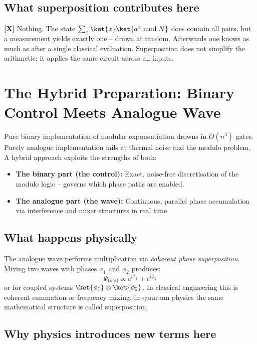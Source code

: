 \subsection{What superposition contributes here}

\textbf{[X]} Nothing. The state $\sum_x \ket{x}\ket{a^x \bmod N}$ does
contain all pairs, but a measurement yields exactly one -- drawn at
random. Afterwards one knows as much as after a single classical
evaluation. Superposition does not simplify the arithmetic; it applies
the same circuit across all inputs.


\section{The Hybrid Preparation: Binary Control Meets Analogue Wave}
\label{sec:hybrid}

Pure binary implementation of modular exponentiation drowns in $O(n^3)$
gates. Purely analogue implementation fails at thermal noise and the
modulo problem. A hybrid approach exploits the strengths of both:

\begin{itemize}
  \item \textbf{The binary part (the control):} Exact, noise-free
    discretisation of the modulo logic -- governs which phase paths are
    enabled.
  \item \textbf{The analogue part (the wave):} Continuous, parallel
    phase accumulation via interference and mixer structures in real time.
\end{itemize}

\subsection{What happens physically}

The analogue wave performs multiplication via \emph{coherent phase
superposition}. Mixing two waves with phases $\phi_1$ and $\phi_2$
produces:
\[
  \Psi_{\text{total}} \propto e^{i\phi_1} + e^{i\phi_2}
\]
or for coupled systems $\ket{\phi_1} \otimes \ket{\phi_2}$. In classical
engineering this is coherent summation or frequency mixing; in quantum
physics the same mathematical structure is called superposition.

\subsection{Why physics introduces new terms here}

